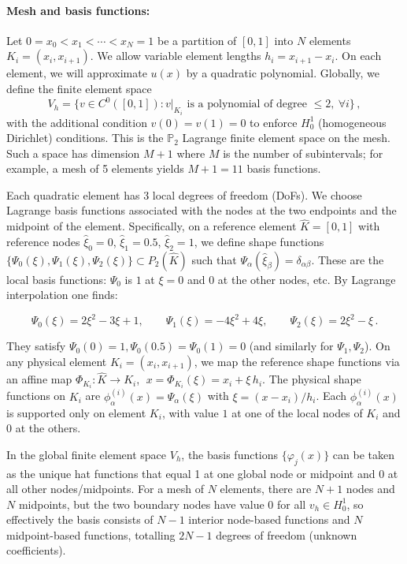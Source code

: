 \documentclass[a4paper,10pt]{article}
\begin{document}
\paragraph{Mesh and basis functions:}
Let \(0 = x_0 < x_1 < \cdots < x_N = 1\) be a partition of \([0,1]\) into \(N\) elements \(K_i = (x_i, x_{i+1})\).
We allow variable element lengths \(h_i = x_{i+1}-x_i\). On each element, we will approximate \(u(x)\) by a quadratic polynomial. Globally, we define the finite element space
$$
	V_h = \{ v \in C^0([0,1]) : v|_{K_i} \text{ is a polynomial of degree }\le 2,\ \forall i\}\,,
$$
with the additional condition \(v(0)=v(1)=0\) to enforce \(H^1_0\) (homogeneous Dirichlet) conditions.
This is the \(\mathbb{P}_2\) Lagrange finite element space on the mesh. Such a space has dimension \(M+1\) where \(M\) is the number of subintervals; for example, a mesh of 5 elements yields \(M+1=11\) basis functions.

Each quadratic element has 3 local degrees of freedom (DoFs).
We choose Lagrange basis functions associated with the nodes at the two endpoints and the midpoint of the element.
Specifically, on a reference element \(\hat K = [0,1]\) with reference nodes \(\hat\xi_0=0\), \(\hat\xi_1=0.5\), \(\hat\xi_2=1\), we define shape functions \(\{\Psi_0(\xi), \Psi_1(\xi), \Psi_2(\xi)\} \subset P_2(\hat K)\) such that \(\Psi_\alpha(\hat\xi_\beta) = \delta_{\alpha\beta}\).
These are the local basis functions: \(\Psi_0\) is \(1\) at \(\xi=0\) and \(0\) at the other nodes, etc. By Lagrange interpolation one finds:

$$
	\Psi_0(\xi) = 2\xi^2 - 3\xi + 1,\qquad
	\Psi_1(\xi) = -4\xi^2 + 4\xi,\qquad
	\Psi_2(\xi) = 2\xi^2 - \xi\,.
$$

They satisfy \(\Psi_0(0)=1,\Psi_0(0.5)=\Psi_0(1)=0\) (and similarly for \(\Psi_1,\Psi_2\)). On any physical element \(K_i=(x_i,x_{i+1})\), we map the reference shape functions via an affine map \(\Phi_{K_i}: \hat K \to K_i\), \(\;x = \Phi_{K_i}(\xi) = x_i + \xi\,h_i\).
The physical shape functions on \(K_i\) are \(\phi_{\alpha}^{(i)}(x) = \Psi_\alpha(\xi)\) with \(\xi = (x-x_i)/h_i\).
Each \(\phi_{\alpha}^{(i)}(x)\) is supported only on element \(K_i\), with value \(1\) at one of the local nodes of \(K_i\) and \(0\) at the others.

In the global finite element space \(V_h\), the basis functions \(\{\varphi_j(x)\}\) can be taken as the unique hat functions that equal 1 at one global node or midpoint and 0 at all other nodes/midpoints.
For a mesh of \(N\) elements, there are \(N+1\) nodes and \(N\) midpoints, but the two boundary nodes have value 0 for all \(v_h \in H^1_0\), so effectively the basis consists of \(N-1\) interior node-based functions and \(N\) midpoint-based functions, totalling \(2N-1\) degrees of freedom (unknown coefficients).
\end{document}
